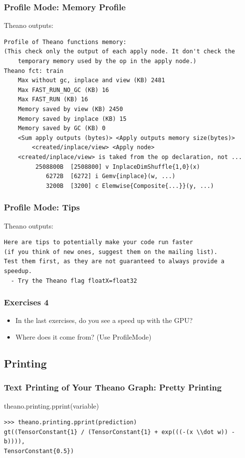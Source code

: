 \documentclass[a4paper,9pt]{beamer}
\begin{document}
\begin{frame}[fragile]
\frametitle{Profile Mode: Memory Profile}
Theano outputs:
\vfill
\begin{Verbatim}
Profile of Theano functions memory:
(This check only the output of each apply node. It don't check the 
    temporary memory used by the op in the apply node.)
Theano fct: train
    Max without gc, inplace and view (KB) 2481
    Max FAST_RUN_NO_GC (KB) 16
    Max FAST_RUN (KB) 16
    Memory saved by view (KB) 2450
    Memory saved by inplace (KB) 15
    Memory saved by GC (KB) 0
    <Sum apply outputs (bytes)> <Apply outputs memory size(bytes)> 
        <created/inplace/view> <Apply node>
    <created/inplace/view> is taked from the op declaration, not ...
         2508800B  [2508800] v InplaceDimShuffle{1,0}(x)
            6272B  [6272] i Gemv{inplace}(w, ...)
            3200B  [3200] c Elemwise{Composite{...}}(y, ...)
\end{Verbatim}
\end{frame}

\begin{frame}[fragile]
\frametitle{Profile Mode: Tips}
Theano outputs:
\vfill
\begin{Verbatim}
Here are tips to potentially make your code run faster
(if you think of new ones, suggest them on the mailing list).
Test them first, as they are not guaranteed to always provide a speedup.
  - Try the Theano flag floatX=float32
\end{Verbatim}
\end{frame}

\begin{frame}
\frametitle{Exercises 4}

\begin{itemize}
\item In the last exercises, do you see a speed up with the GPU?
\item Where does it come from? (Use ProfileMode)
\end{itemize}
\end{frame}


\subsection{Printing}
\begin{frame}[fragile]
\frametitle{Text Printing of Your Theano Graph: Pretty Printing}
theano.printing.pprint(variable)
\vfill
\begin{Verbatim}
>>> theano.printing.pprint(prediction)
gt((TensorConstant{1} / (TensorConstant{1} + exp(((-(x \\dot w)) - b)))),
TensorConstant{0.5})
\end{Verbatim}
\end{frame}
\end{document}
